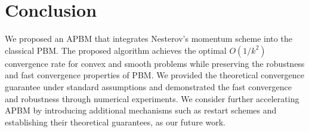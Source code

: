 \documentclass[letterpaper, 10 pt, conference]{ieeeconf}  %
\begin{document}

\section{Conclusion}\label{sec:conclusion}
We proposed an APBM that integrates Nesterov's momentum scheme into the classical PBM. The proposed algorithm achieves the optimal $O(1/k^2)$ convergence rate for convex and smooth problems while preserving the robustness and fast convergence properties of PBM. We provided the theoretical convergence guarantee under standard assumptions and demonstrated the fast convergence and robustness through numerical experiments. We consider further accelerating APBM by introducing additional mechanisms such as restart schemes and establishing their theoretical guarantees, as our future work.
\end{document}
